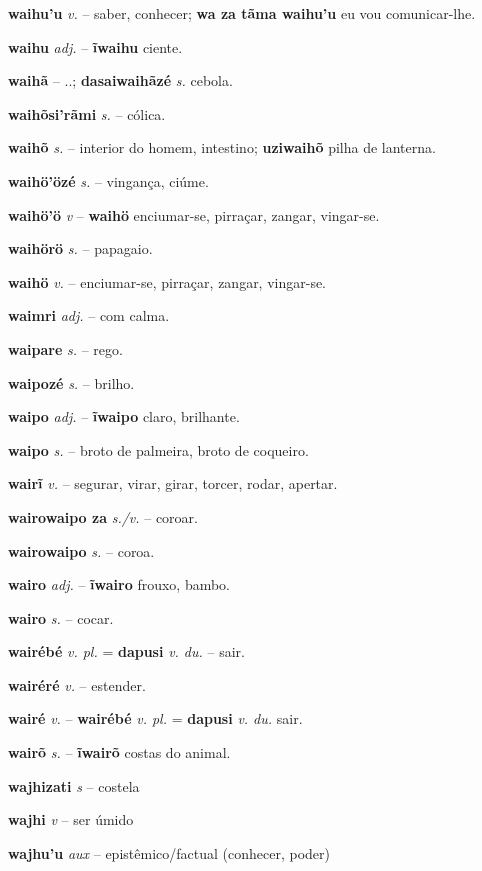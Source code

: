 \textbf{waihu'u} \textit{v.} -- saber, conhecer; \textbf{wa za tãma waihu'u} eu vou comunicar-lhe.

\textbf{waihu} \textit{adj.} -- \textbf{ĩwaihu} ciente.

\textbf{waihã} \textit{} -- ..; \textbf{dasaiwaihãzé} \textit{s.} cebola.

\textbf{waihõsi'rãmi} \textit{s.} -- cólica.

\textbf{waihõ} \textit{s.} -- interior do homem, intestino; \textbf{uziwaihõ} pilha de lanterna.

\textbf{waihö'özé} \textit{s.} -- vingança, ciúme.

\textbf{waihö'ö} \textit{v} -- \textbf{waihö} enciumar-se, pirraçar, zangar, vingar-se.

\textbf{waihörö} \textit{s.} -- papagaio.

\textbf{waihö} \textit{v.} -- enciumar-se, pirraçar, zangar, vingar-se.

\textbf{waimri} \textit{adj.} -- com calma.

\textbf{waipare} \textit{s.} -- rego.

\textbf{waipozé} \textit{s.} -- brilho.

\textbf{waipo} \textit{adj.} -- \textbf{ĩwaipo} claro, brilhante.

\textbf{waipo} \textit{s.} -- broto de palmeira, broto de coqueiro.

\textbf{wairĩ} \textit{v.} -- segurar, virar, girar, torcer, rodar, apertar.

\textbf{wairowaipo za} \textit{s./v.} -- coroar.

\textbf{wairowaipo} \textit{s.} -- coroa.

\textbf{wairo} \textit{adj.} -- \textbf{ĩwairo} frouxo, bambo.

\textbf{wairo} \textit{s.} -- cocar.

\textbf{wairébé} \textit{v. pl.} = \textbf{dapusi} \textit{v. du.} -- sair.

\textbf{wairéré} \textit{v.} -- estender.

\textbf{wairé} \textit{v.} -- \textbf{wairébé} \textit{v. pl.} = \textbf{dapusi} \textit{v. du.} sair.

\textbf{wairõ} \textit{s.} -- \textbf{ĩwairõ} costas do animal.

\textbf{wajhizati} \textit{s} -- {costela}

\textbf{wajhi} \textit{v} -- {ser úmido}

\textbf{wajhu'u} \textit{aux} -- {epistêmico/factual (conhecer, poder)}

